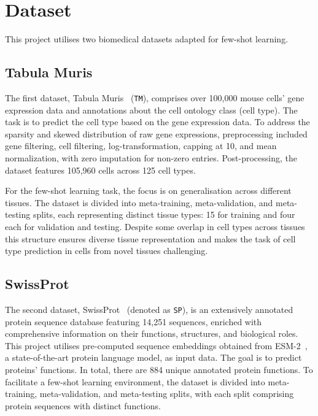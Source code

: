 \section{Dataset}

This project utilises two biomedical datasets adapted for few-shot learning.


\subsection{Tabula Muris}

The first dataset, Tabula Muris~\cite{tabula2018} (\texttt{TM}), comprises over 100,000 mouse cells' gene expression data and annotations about the cell ontology class (cell type). The task is to predict the cell type based on the gene expression data. To address the sparsity and skewed distribution of raw gene expressions, preprocessing included gene filtering, cell filtering, log-transformation, capping at 10, and mean normalization, with zero imputation for non-zero entries. Post-processing, the dataset features 105,960 cells across 125 cell types.

For the few-shot learning task, the focus is on generalisation across different tissues. The dataset is divided into meta-training, meta-validation, and meta-testing splits, each representing distinct tissue types: 15 for training and four each for validation and testing. Despite some overlap in cell types across tissues this structure ensures diverse tissue representation and makes the task of cell type prediction in cells from novel tissues challenging.

\subsection{SwissProt}


The second dataset, SwissProt~\cite{uniprot2019} (denoted as \texttt{SP}), is an extensively annotated protein sequence database featuring 14,251 sequences, enriched with comprehensive information on their functions, structures, and biological roles. This project utilises pre-computed sequence embeddings obtained from ESM-2~\cite{esm-2}, a state-of-the-art protein language model, as input data. The goal is to predict proteins' functions. In total, there are 884 unique annotated protein functions. To facilitate a few-shot learning environment, the dataset is divided into meta-training, meta-validation, and meta-testing splits, with each split comprising protein sequences with distinct functions.

